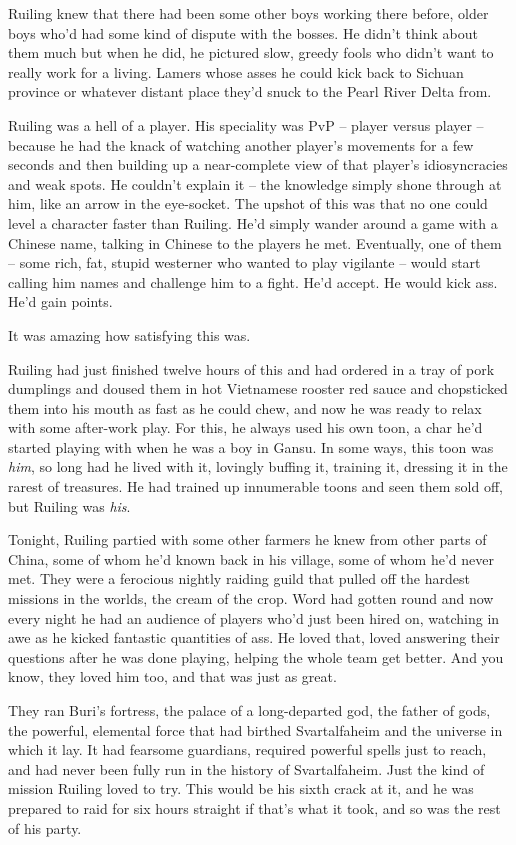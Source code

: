 Ruiling knew that there had been some other boys working there
before, older boys who'd had some kind of dispute with the bosses.
He didn't think about them much but when he did, he pictured slow,
greedy fools who didn't want to really work for a living. Lamers
whose asses he could kick back to Sichuan province or whatever
distant place they'd snuck to the Pearl River Delta from.

Ruiling was a hell of a player. His speciality was PvP -- player
versus player -- because he had the knack of watching another
player's movements for a few seconds and then building up a
near-complete view of that player's idiosyncracies and weak spots.
He couldn't explain it -- the knowledge simply shone through at
him, like an arrow in the eye-socket. The upshot of this was that
no one could level a character faster than Ruiling. He'd simply
wander around a game with a Chinese name, talking in Chinese to the
players he met. Eventually, one of them -- some rich, fat, stupid
westerner who wanted to play vigilante -- would start calling him
names and challenge him to a fight. He'd accept. He would kick ass.
He'd gain points.

It was amazing how satisfying this was.

Ruiling had just finished twelve hours of this and had ordered in a
tray of pork dumplings and doused them in hot Vietnamese rooster
red sauce and chopsticked them into his mouth as fast as he could
chew, and now he was ready to relax with some after-work play. For
this, he always used his own toon, a char he'd started playing with
when he was a boy in Gansu. In some ways, this toon was \emph{him},
so long had he lived with it, lovingly buffing it, training it,
dressing it in the rarest of treasures. He had trained up
innumerable toons and seen them sold off, but Ruiling was
\emph{his}.

Tonight, Ruiling partied with some other farmers he knew from other
parts of China, some of whom he'd known back in his village, some
of whom he'd never met. They were a ferocious nightly raiding guild
that pulled off the hardest missions in the worlds, the cream of
the crop. Word had gotten round and now every night he had an
audience of players who'd just been hired on, watching in awe as he
kicked fantastic quantities of ass. He loved that, loved answering
their questions after he was done playing, helping the whole team
get better. And you know, they loved him too, and that was just as
great.

They ran Buri's fortress, the palace of a long-departed god, the
father of gods, the powerful, elemental force that had birthed
Svartalfaheim and the universe in which it lay. It had fearsome
guardians, required powerful spells just to reach, and had never
been fully run in the history of Svartalfaheim. Just the kind of
mission Ruiling loved to try. This would be his sixth crack at it,
and he was prepared to raid for six hours straight if that's what
it took, and so was the rest of his party.

